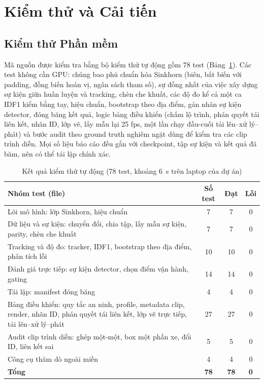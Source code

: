 \section{Kiểm thử và Cải tiến}
\label{sec:testing_improvements}

\subsection{Kiểm thử Phần mềm}
\label{sec:software_testing}

Mã nguồn được kiểm tra bằng bộ kiểm thử tự động gồm 78 test (Bảng~\ref{tab:tests}). Các test không cần GPU: chúng bao phủ chuẩn hóa Sinkhorn (biên, bất biến với padding, đồng biến hoán vị, ngân sách tham số), sự đồng nhất của việc xây dựng sự kiện giữa huấn luyện và tracking, chèn che khuất, các độ đo kể cả một ca IDF1 kiểm bằng tay, hiệu chuẩn, bootstrap theo địa điểm, gán nhãn sự kiện detector, đóng băng kết quả, logic bảng điều khiển (chấm lộ trình, phán quyết tái liên kết, nhãn ID, lớp vẽ, lấy mẫu lại 25 fps, một lần chạy đầu-cuối tải lên--xử lý--phát) và bước audit theo ground truth nghiêm ngặt dùng để kiểm tra các clip trình diễn. Mọi số liệu báo cáo đều gắn với checkpoint, tập sự kiện và kết quả đã băm, nên có thể tái lập chính xác.

\begin{table}[H]
    \centering
    \caption{Kết quả kiểm thử tự động (78 test, khoảng $6$~s trên laptop của dự án)}
    \label{tab:tests}
    \small
    \small
    \begin{tabularx}{\textwidth}{X c c c}
        \toprule
        \textbf{Nhóm test (file)} & \textbf{Số test} & \textbf{Đạt} & \textbf{Lỗi} \\
        \midrule
        Lõi mô hình: lớp Sinkhorn, hiệu chuẩn & 7 & 7 & 0 \\
        Dữ liệu và sự kiện: chuyển đổi, chia tập, lấy mẫu sự kiện, parity, chèn che khuất & 7 & 7 & 0 \\
        Tracking và độ đo: tracker, IDF1, bootstrap theo địa điểm, phân tích lỗi & 10 & 10 & 0 \\
        Đánh giá trực tiếp: sự kiện detector, chọn điểm vận hành, gating & 14 & 14 & 0 \\
        Tái lập: manifest đóng băng & 4 & 4 & 0 \\
        Bảng điều khiển: quy tắc an ninh, profile, metadata clip, render, nhãn ID, phán quyết tái liên kết, lớp vẽ trực tiếp, tải lên--xử lý--phát & 27 & 27 & 0 \\
        Audit clip trình diễn: ghép một-một, box một phần xe, đổi ID, liên kết sai & 5 & 5 & 0 \\
        Công cụ thăm dò ngoài miền & 4 & 4 & 0 \\
        \midrule
        \textbf{Tổng} & \textbf{78} & \textbf{78} & \textbf{0} \\
        \bottomrule
    \end{tabularx}
\end{table}

